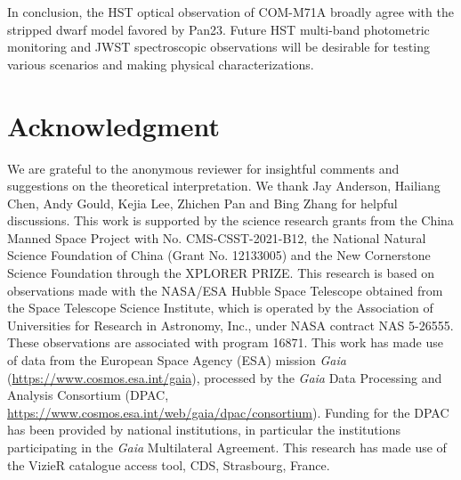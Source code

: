 \documentclass[twocolumn]{aastex631}
\begin{document}
In conclusion, the HST optical observation of COM-M71A broadly agree with the stripped dwarf model favored by Pan23. Future HST multi-band photometric monitoring and JWST spectroscopic observations will be desirable for testing various scenarios and making physical characterizations.
 \section*{Acknowledgment}
We are grateful to the anonymous reviewer for insightful comments and suggestions on the theoretical interpretation. We thank Jay Anderson, Hailiang Chen, Andy Gould, Kejia Lee, Zhichen Pan and Bing Zhang for helpful discussions. This work is supported by the science research grants from the China Manned Space Project with No. CMS-CSST-2021-B12, the National Natural Science Foundation of China (Grant No. 12133005) and the New Cornerstone Science Foundation through the XPLORER PRIZE. This research is based on observations made with the NASA/ESA Hubble Space Telescope obtained from the Space Telescope Science Institute, which is operated by the Association of Universities for Research in Astronomy, Inc., under NASA contract NAS 5-26555. These observations are associated with program 16871.  This work has made use of data from the European Space Agency (ESA) mission {\it Gaia} (\url{https://www.cosmos.esa.int/gaia}), processed by the {\it Gaia} Data Processing and Analysis Consortium (DPAC,
\url{https://www.cosmos.esa.int/web/gaia/dpac/consortium}). Funding for the DPAC has been provided by national institutions, in particular the institutions participating in the {\it Gaia} Multilateral Agreement. This research has made use of the VizieR catalogue access tool, CDS, Strasbourg, France.


{}



\end{document}
